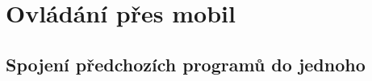 \chapter{Ovládání přes mobil} \label{3_kap}

\section{Spojení předchozích programů do jednoho}

\section{}

\section{}

\section{}






\newpage